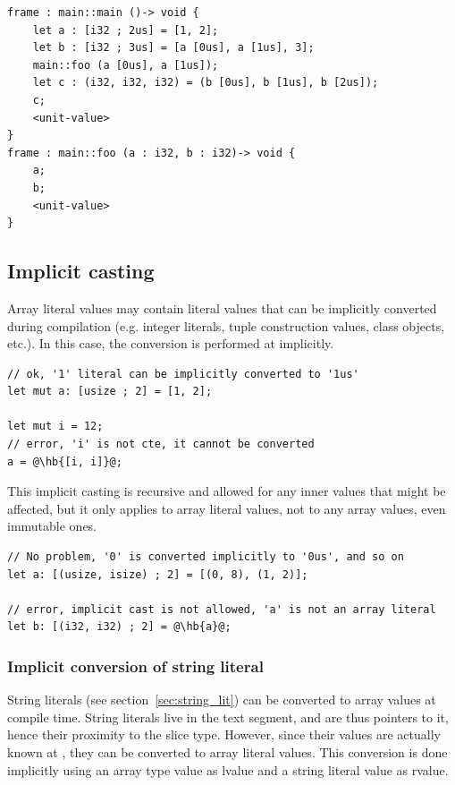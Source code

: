 \begin{lstlisting}[style=myilVerb]
frame : main::main ()-> void {
    let a : [i32 ; 2us] = [1, 2];
    let b : [i32 ; 3us] = [a [0us], a [1us], 3];
    main::foo (a [0us], a [1us]);
    let c : (i32, i32, i32) = (b [0us], b [1us], b [2us]);
    c;
    <unit-value>
}
frame : main::foo (a : i32, b : i32)-> void {
    a;
    b;
    <unit-value>
}
\end{lstlisting}


\subsection{Implicit casting}

Array literal values may contain literal values that can be implicitly
converted during compilation (e.g. integer literals, tuple construction values,
class objects, etc.). In this case, the conversion is performed at 
implicitly.

\begin{lstlisting}[style=coloredverbatimError, escapechar=@]
// ok, '1' literal can be implicitly converted to '1us'
let mut a: [usize ; 2] = [1, 2];

let mut i = 12;
// error, 'i' is not cte, it cannot be converted
a = @\hb{[i, i]}@;
\end{lstlisting}

This implicit casting is recursive and allowed for any inner values that might
be affected, but it only applies to array literal values, not to any array
values, even immutable ones.

\begin{lstlisting}[style=coloredverbatimError, escapechar=@]
// No problem, '0' is converted implicitly to '0us', and so on
let a: [(usize, isize) ; 2] = [(0, 8), (1, 2)];

// error, implicit cast is not allowed, 'a' is not an array literal
let b: [(i32, i32) ; 2] = @\hb{a}@;
\end{lstlisting}

\subsubsection{Implicit conversion of string literal}

String literals (see section~\ref{sec:string_lit}) can be converted to array
values at compile time. String literals live in the text segment, and are
thus pointers to it, hence their proximity to the slice type. However, since their
values are actually known at , they can be converted to array
literal values. This conversion is done implicitly using an array type value as
lvalue and a  string literal value as rvalue.

